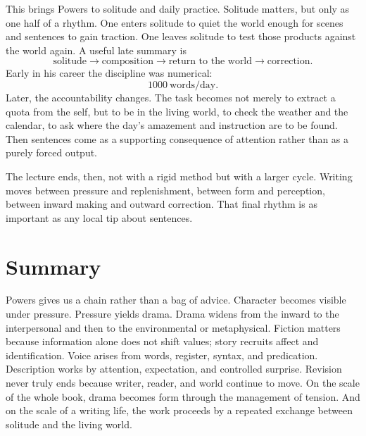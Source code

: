 This brings Powers to solitude and daily practice. Solitude matters, but only as one half of a rhythm. One enters solitude to quiet the world enough for scenes and sentences to gain traction. One leaves solitude to test those products against the world again. A useful late summary is
\begin{equation}
\text{solitude} \to \text{composition} \to \text{return to the world} \to \text{correction}.
\end{equation}
Early in his career the discipline was numerical:
\begin{equation}
1000\ \text{words/day}.
\end{equation}
Later, the accountability changes. The task becomes not merely to extract a quota from the self, but to be in the living world, to check the weather and the calendar, to ask where the day's amazement and instruction are to be found. Then sentences come as a supporting consequence of attention rather than as a purely forced output.

The lecture ends, then, not with a rigid method but with a larger cycle. Writing moves between pressure and replenishment, between form and perception, between inward making and outward correction. That final rhythm is as important as any local tip about sentences.

\section{Summary}

Powers gives us a chain rather than a bag of advice. Character becomes visible under pressure. Pressure yields drama. Drama widens from the inward to the interpersonal and then to the environmental or metaphysical. Fiction matters because information alone does not shift values; story recruits affect and identification. Voice arises from words, register, syntax, and predication. Description works by attention, expectation, and controlled surprise. Revision never truly ends because writer, reader, and world continue to move. On the scale of the whole book, drama becomes form through the management of tension. And on the scale of a writing life, the work proceeds by a repeated exchange between solitude and the living world.